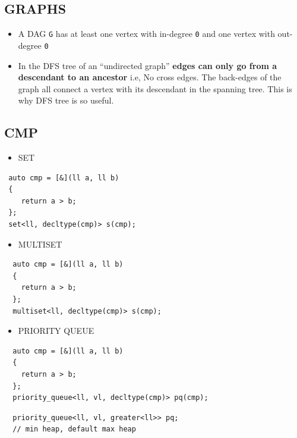 \hypertarget{graphs}{%
\subsection{GRAPHS}\label{graphs}}

\begin{itemize}
\item
  A DAG \texttt{G} has at least one vertex with in-degree \texttt{0} and
  one vertex with out-degree \texttt{0}
\item
  In the DFS tree of an ``undirected graph'' \textbf{edges can only go
  from a descendant to an ancestor} i.e, No cross edges. The back-edges
  of the graph all connect a vertex with its descendant in the spanning
  tree. This is why DFS tree is so useful.
\end{itemize}

\hypertarget{cmp}{%
\subsection{CMP}\label{cmp}}

\begin{itemize}
\tightlist
\item
  SET
\end{itemize}

\begin{verbatim}
 auto cmp = [&](ll a, ll b)
 {
    return a > b;
 }; 
 set<ll, decltype(cmp)> s(cmp); 
\end{verbatim}

\begin{itemize}
\tightlist
\item
  MULTISET
\end{itemize}

\begin{verbatim}
  auto cmp = [&](ll a, ll b)
  {
    return a > b;
  }; 
  multiset<ll, decltype(cmp)> s(cmp); 
\end{verbatim}

\begin{itemize}
\tightlist
\item
  PRIORITY QUEUE
\end{itemize}

\begin{verbatim}
  auto cmp = [&](ll a, ll b)
  {
    return a > b;
  }; 
  priority_queue<ll, vl, decltype(cmp)> pq(cmp); 
\end{verbatim}

\begin{verbatim}
  priority_queue<ll, vl, greater<ll>> pq; 
  // min heap, default max heap
\end{verbatim}

